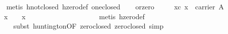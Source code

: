 \begin{isabellebody}
%
\isadelimproof
\ \ \ \ %
\endisadelimproof
%
\isatagproof
{}\isamarkupfalse%
\ {}metis\ hnot{}closed\ hzero{}def\ one{}closed{}%
\endisatagproof
{\isafoldproof}%
%
\isadelimproof
\isanewline
%
\endisadelimproof
\isanewline
\ \ \isamarkupfalse%
\ or{}zero{}\isanewline
\ \ \ \ \ xc{}\ {}x\ {}\ carrier\ A{}\isanewline
\ \ \ \ \ {}x\ {}\ {}\ {}\ x{}\isanewline
%
\isadelimproof
\ \ %
\endisadelimproof
%
\isatagproof
{}\isamarkupfalse%
\ {}\isanewline
\ \ \ \ \isamarkupfalse%
\ {}{}{}\ {}\ {}{}\isanewline
\ \ \ \ \ \ \isamarkupfalse%
\ {}metis\ hzero{}def{}\isanewline
\ \ \ \ \isamarkupfalse%
\ \isamarkupfalse%
\ {}{}{}{}\ {}\ {}\ {}{}\ {}\ {}\ {}{}\ {}\ {}\ {}{}\ {}\ {}\ {}\ {}{}{}\isanewline
\ \ \ \ \ \ \isamarkupfalse%
\ {}subst\ huntington{}OF\ zero{}closed\ zero{}closed{}{}\ simp{}\isanewline

\end{isabellebody}
